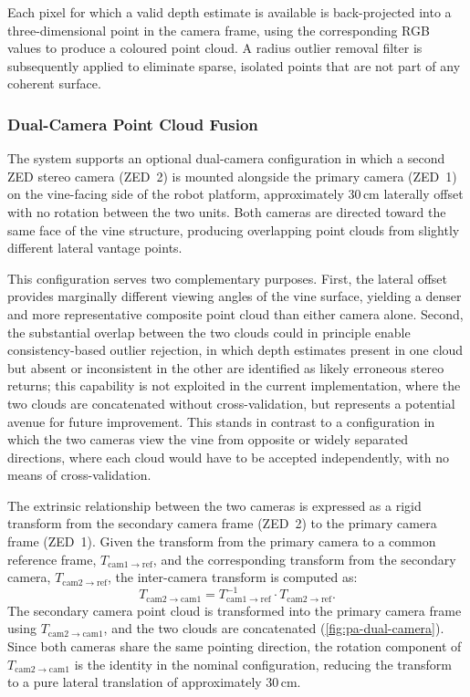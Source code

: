 Each pixel for which a valid depth estimate is available is back-projected into a three-dimensional point in the camera frame, using the corresponding RGB values to produce a coloured point cloud. A radius outlier removal filter is subsequently applied to eliminate sparse, isolated points that are not part of any coherent surface.

\subsubsection{Dual-Camera Point Cloud Fusion}
\label{subsubsec:pa-dual-camera}

The system supports an optional dual-camera configuration in which a second ZED stereo camera (ZED~2) is mounted alongside the primary camera (ZED~1) on the vine-facing side of the robot platform, approximately 30\,cm laterally offset with no rotation between the two units. Both cameras are directed toward the same face of the vine structure, producing overlapping point clouds from slightly different lateral vantage points.

This configuration serves two complementary purposes. First, the lateral offset provides marginally different viewing angles of the vine surface, yielding a denser and more representative composite point cloud than either camera alone. Second, the substantial overlap between the two clouds could in principle enable consistency-based outlier rejection, in which depth estimates present in one cloud but absent or inconsistent in the other are identified as likely erroneous stereo returns; this capability is not exploited in the current implementation, where the two clouds are concatenated without cross-validation, but represents a potential avenue for future improvement. This stands in contrast to a configuration in which the two cameras view the vine from opposite or widely separated directions, where each cloud would have to be accepted independently, with no means of cross-validation.

The extrinsic relationship between the two cameras is expressed as a rigid transform from the secondary camera frame (ZED~2) to the primary camera frame (ZED~1). Given the transform from the primary camera to a common reference frame, $T_{\mathrm{cam1} \to \mathrm{ref}}$, and the corresponding transform from the secondary camera, $T_{\mathrm{cam2} \to \mathrm{ref}}$, the inter-camera transform is computed as:
%
\begin{equation}
    T_{\mathrm{cam2} \to \mathrm{cam1}} = T_{\mathrm{cam1} \to \mathrm{ref}}^{-1} \cdot T_{\mathrm{cam2} \to \mathrm{ref}}.
    \label{eq:dual-camera-extrinsic}
\end{equation}
%
The secondary camera point cloud is transformed into the primary camera frame using $T_{\mathrm{cam2} \to \mathrm{cam1}}$, and the two clouds are concatenated (\cref{fig:pa-dual-camera}). Since both cameras share the same pointing direction, the rotation component of $T_{\mathrm{cam2} \to \mathrm{cam1}}$ is the identity in the nominal configuration, reducing the transform to a pure lateral translation of approximately 30\,cm.

